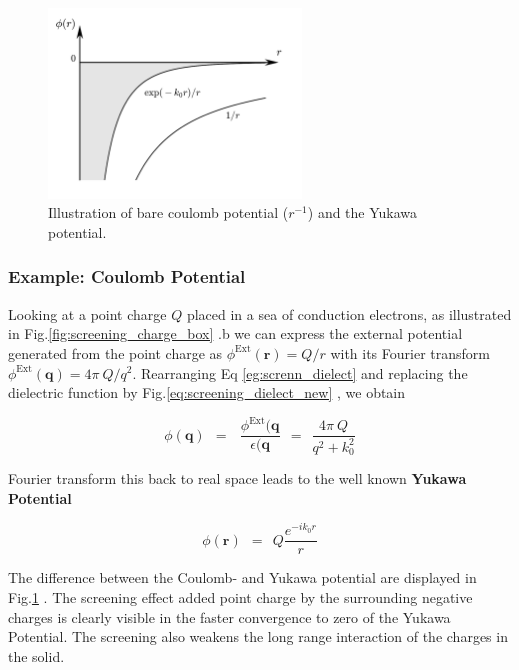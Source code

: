\documentclass[10pt]{report}
\numberwithin{equation}{chapter}
\newcommand{\myRef}[1]{
  Fig.\ref{#1}
}
\newcommand{\refEq}[1]{
  Eq  \ref{#1}
}
\begin{document}
\begin{figure}
  \centering
  \includegraphics[width=0.6\textwidth]{../img/screening_yukawa.pdf}
  \caption{Illustration of bare coulomb potential ($r^{-1}$) and the Yukawa potential.}
  \label{fig:screening_yukawa}
\end{figure}



\subsubsection{Example: Coulomb Potential}

Looking at a point charge $Q$ placed in a sea of conduction electrons, as illustrated in \myRef{fig:screening_charge_box}.b we can express the external potential generated from the point charge as $\phi^\text{Ext}(\mathbf{r}) = Q/r$ with its Fourier transform  $\phi^\text{Ext}(\mathbf{q}) = 4\pi\ Q/q^2$. Rearranging \refEq{eg:screnn_dielect} and replacing the dielectric function by \myRef{eq:screening_dielect_new}, we obtain

\begin{equation}
  \phi(\mathbf{q}) ~~=~~~\frac{\phi^\text{Ext}(\mathbf{q}}{\epsilon(\mathbf{q}} 
  ~~=~~ \frac{4\pi\ Q}{q^2 + k^2_0}
\end{equation}

Fourier transform this back to real space leads to the well known \textbf{Yukawa Potential} 

\begin{equation}
  \phi(\mathbf{r}) ~~=~~ Q \frac{e^{-i k_0 r}}{r}
\end{equation}

The difference between the Coulomb- and Yukawa potential are displayed in \myRef{fig:screening_yukawa}. The screening effect added point charge by the surrounding negative charges is clearly visible in the faster convergence to zero of the Yukawa Potential. The screening also weakens the long range interaction of the charges in the solid.
\end{document}
